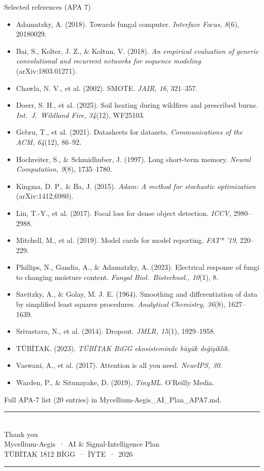 \documentclass[aspectratio=169,11pt]{beamer}
\newcommand{\src}[1]{{\scriptsize\color{aegisLeaf}#1}}
\begin{document}
\begin{frame}[allowframebreaks]{Selected references (APA 7)}
  \footnotesize
  \begin{itemize}
    \item Adamatzky, A. (2018). Towards fungal computer. \emph{Interface Focus, 8}(6), 20180029.
    \item Bai, S., Kolter, J. Z., \& Koltun, V. (2018). \emph{An empirical evaluation of generic convolutional and recurrent networks for sequence modeling} (arXiv:1803.01271).
    \item Chawla, N. V., et al. (2002). SMOTE. \emph{JAIR, 16}, 321--357.
    \item Doerr, S. H., et al. (2025). Soil heating during wildfires and prescribed burns. \emph{Int.\ J.\ Wildland Fire, 34}(12), WF25103.
    \item Gebru, T., et al. (2021). Datasheets for datasets. \emph{Communications of the ACM, 64}(12), 86--92.
    \item Hochreiter, S., \& Schmidhuber, J. (1997). Long short-term memory. \emph{Neural Computation, 9}(8), 1735--1780.
    \item Kingma, D. P., \& Ba, J. (2015). \emph{Adam: A method for stochastic optimization} (arXiv:1412.6980).
    \item Lin, T.-Y., et al. (2017). Focal loss for dense object detection. \emph{ICCV}, 2980--2988.
    \item Mitchell, M., et al. (2019). Model cards for model reporting. \emph{FAT* '19}, 220--229.
    \item Phillips, N., Gandia, A., \& Adamatzky, A. (2023). Electrical response of fungi to changing moisture content. \emph{Fungal Biol.\ Biotechnol., 10}(1), 8.
    \item Savitzky, A., \& Golay, M. J. E. (1964). Smoothing and differentiation of data by simplified least squares procedures. \emph{Analytical Chemistry, 36}(8), 1627--1639.
    \item Srivastava, N., et al. (2014). Dropout. \emph{JMLR, 15}(1), 1929--1958.
    \item TÜBİTAK. (2023). \emph{TÜBİTAK BiGG ekosisteminde büyük değişiklik.}
    \item Vaswani, A., et al. (2017). Attention is all you need. \emph{NeurIPS, 30}.
    \item Warden, P., \& Situnayake, D. (2019). \emph{TinyML.} O'Reilly Media.
  \end{itemize}
  \src{Full APA-7 list (20 entries) in Mycellium-Aegis\_AI\_Plan\_APA7.md.}
\end{frame}

{%
\begin{frame}[plain]
  \vfill
  \centering
  {\color{aegisLeaf}\rule{3cm}{2pt}}\\[0.8em]
  {\color{aegisDark} Thank you}\\[0.5em]
  {\color{aegisInk} Mycellium-Aegis \,·\, AI \& Signal-Intelligence Plan}\\[0.3em]
  {\footnotesize\color{aegisLeaf} TÜBİTAK 1812 BİGG \,·\, İYTE \,·\, 2026}\\[0.8em]
  {\color{aegisLeaf}\rule{3cm}{2pt}}
  \vfill
\end{frame}
}
\end{document}
